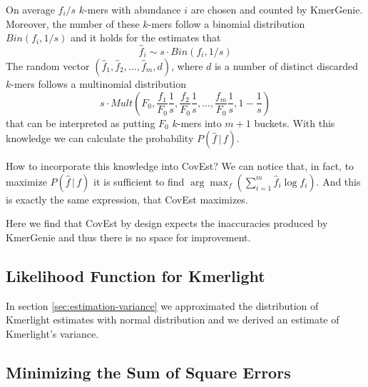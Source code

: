 On average $f_i / s$ $k$-mers with abundance $i$ are chosen and counted by KmerGenie.
Moreover, the number of these $k$-mers follow a binomial distribution $Bin(f_i, 1/s)$
and it holds for the estimates that
$$\hat f_i \sim s \cdot Bin(f_i, 1/s)$$
The random vector $(\hat f_1, \hat f_2, \dots, \hat f_m, d)$, where $d$ is a number
of distinct discarded $k$-mers follows a multinomial distribution 
$$s \cdot Mult\left(F_0, \frac{f_1}{F_0} \frac{1}{s}, \frac{f_2}{F_0} \frac{1}{s}, \dots, 
\frac{f_m}{F_0} \frac{1}{s}, 1-\frac{1}{s}\right)$$
that can be interpreted as putting $F_0$ $k$-mers into $m+1$ buckets. With this knowledge we can
calculate the probability $P(\hat f\,|\,f)$.

\medskip

How to incorporate this knowledge into CovEst? We can notice that, in fact, to maximize 
$P(\hat f\,|\,f)$ it is sufficient to find $\arg \max_f \left(\sum_{i=1}^m \hat f_i \log f_i
\right)$. And this is exactly the same expression, that CovEst maximizes.

Here we find that CovEst by design expects the inaccuracies produced by KmerGenie
and thus there is no space for improvement.

\subsection{Likelihood Function for Kmerlight}
In section \ref{sec:estimation-variance} we approximated the distribution of Kmerlight
estimates with normal distribution and we derived an estimate of Kmerlight's variance.



\subsection{Minimizing the Sum of Square Errors}

